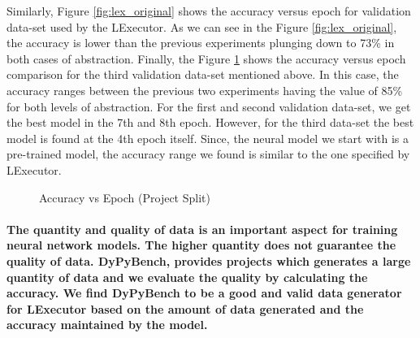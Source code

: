 Similarly, Figure \ref{fig:lex_original} shows the accuracy versus epoch for validation data-set used by the LExecutor.
As we can see in the Figure \ref{fig:lex_original}, the accuracy is lower than the previous experiments plunging down to 73\% in both cases of abstraction.
Finally, the Figure \ref{fig:lex_project} shows the accuracy versus epoch comparison for the third validation data-set mentioned above.
In this case, the accuracy ranges between the previous two experiments having the value of 85\% for both levels of abstraction.
For the first and second validation data-set, we get the best model in the 7th and 8th epoch.
However, for the third data-set the best model is found at the 4th epoch itself.
Since, the neural model we start with is a pre-trained model, the accuracy range we found is similar to the one specified by LExecutor.
\begin{figure}[ht]
    \centering
    \caption[Accuracy vs Epoch (Project Split)]{\label{fig:lex_project}Accuracy vs Epoch (Project Split) }
\end{figure}

\paragraph{The quantity and quality of data is an important aspect for training neural network models. The higher quantity does not guarantee the quality of data. DyPyBench, provides projects which generates a large quantity of data and we evaluate the quality by calculating the accuracy. We find DyPyBench to be a good and valid data generator for LExecutor based on the amount of data generated and the accuracy maintained by the model.}

